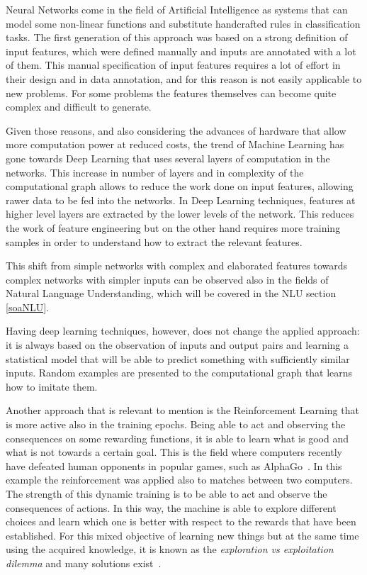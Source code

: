 Neural Networks come in the field of Artificial Intelligence as systems that can model some non-linear functions and substitute handcrafted rules in classification tasks. The first generation of this approach was based on a strong definition of input features, which were defined manually and inputs are annotated with a lot of them. This manual specification of input features requires a lot of effort in their design and in data annotation, and for this reason is not easily applicable to new problems. For some problems the features themselves can become quite complex and difficult to generate.

Given those reasons, and also considering the advances of hardware that allow more computation power at reduced costs, the trend of Machine Learning has gone towards Deep Learning that uses several layers of computation in the networks. This increase in number of layers and in complexity of the computational graph allows to reduce the work done on input features, allowing rawer data to be fed into the networks. In Deep Learning techniques, features at higher level layers are extracted by the lower levels of the network. This reduces the work of feature engineering but on the other hand requires more training samples in order to understand how to extract the relevant features.

This shift from simple networks with complex and elaborated features towards complex networks with simpler inputs can be observed also in the fields of Natural Language Understanding, which will be covered in the NLU section \ref{soaNLU}.

Having deep learning techniques, however, does not change the applied approach: it is always based on the observation of inputs and output pairs and learning a statistical model that will be able to predict something with sufficiently similar inputs. Random examples are presented to the computational graph that learns how to imitate them.

Another approach that is relevant to mention is the Reinforcement Learning that is more active also in the training epochs. Being able to act and observing the consequences on some rewarding functions, it is able to learn what is good and what is not towards a certain goal. This is the field where computers recently have defeated human opponents in popular games, such as AlphaGo~\cite{chouard2016go}. In this example the reinforcement was applied also to matches between two computers. The strength of this dynamic training is to be able to act and observe the consequences of actions. In this way, the machine is able to explore different choices and learn which one is better with respect to the rewards that have been established. For this mixed objective of learning new things but at the same time using the acquired knowledge, it is known as the \textit{exploration vs exploitation dilemma} and many solutions exist~\cite{tokic2010adaptive}.

